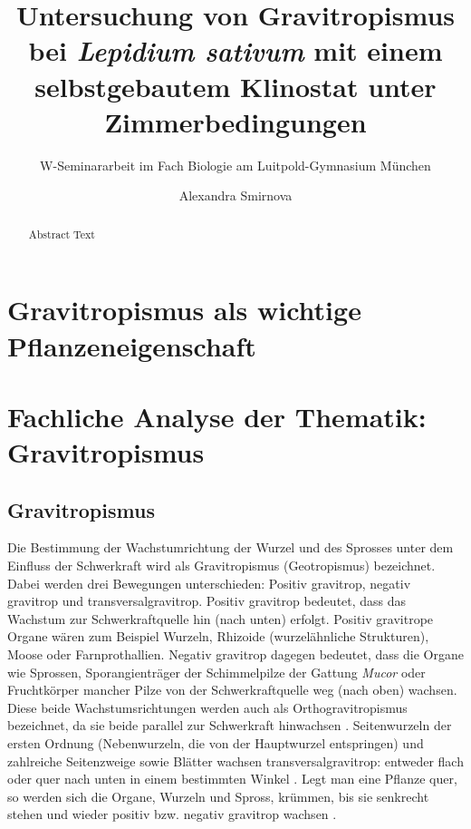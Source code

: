 \documentclass[
a4paper, 
11pt, 
ngerman,
listof=totoc,
bibliography=totocnumbered,
abstracton
]{scrreprt}
\title{Untersuchung von Gravitropismus bei \emph{Lepidium sativum} mit einem selbstgebautem Klinostat unter Zimmerbedingungen}
\subtitle{W-Seminararbeit im Fach Biologie am Luitpold-Gymnasium München}
\author{Alexandra Smirnova}
\begin{document}
	
\begingroup
\renewcommand*{\chapterpagestyle}{empty}
\pagestyle{empty}
\maketitle
\tableofcontents
\clearpage
\endgroup
	
\renewcommand\abstractname{Abstract}
\begin{abstract}
	Abstract Text 
\end{abstract}


\chapter{Gravitropismus als wichtige Pflanzeneigenschaft}

\chapter{Fachliche Analyse der Thematik: Gravitropismus}

\section{Gravitropismus}
Die Bestimmung der Wachstumrichtung der Wurzel und des Sprosses unter dem Einfluss der Schwerkraft wird als Gravitropismus (Geotropismus) bezeichnet. Dabei werden drei Bewegungen unterschieden: Positiv gravitrop, negativ gravitrop und transversalgravitrop. Positiv gravitrop bedeutet, dass das Wachstum zur Schwerkraftquelle hin (nach unten) erfolgt. Positiv gravitrope Organe wären zum Beispiel Wurzeln, Rhizoide (wurzelähnliche Strukturen), Moose oder Farnprothallien. Negativ gravitrop dagegen bedeutet, dass die Organe wie Sprossen, Sporangienträger der Schimmelpilze der Gattung \emph{Mucor} oder Fruchtkörper mancher Pilze von der Schwerkraftquelle weg (nach oben) wachsen.
Diese beide Wachstumsrichtungen werden auch als Orthogravitropismus bezeichnet, da sie beide parallel zur Schwerkraft hinwachsen \parencite[546]{Jacob}.
Seitenwurzeln der ersten Ordnung (Nebenwurzeln, die von der Hauptwurzel entspringen) und zahlreiche Seitenzweige sowie Blätter wachsen transversalgravitrop: entweder flach oder quer nach unten in einem bestimmten Winkel \parencite[449]{Strasburger}. 
Legt man eine Pflanze quer, so werden sich die Organe, Wurzeln und Spross, krümmen, bis sie senkrecht stehen und wieder positiv bzw. negativ gravitrop wachsen
\parencite[528]{Luettge}.
\end{document}
